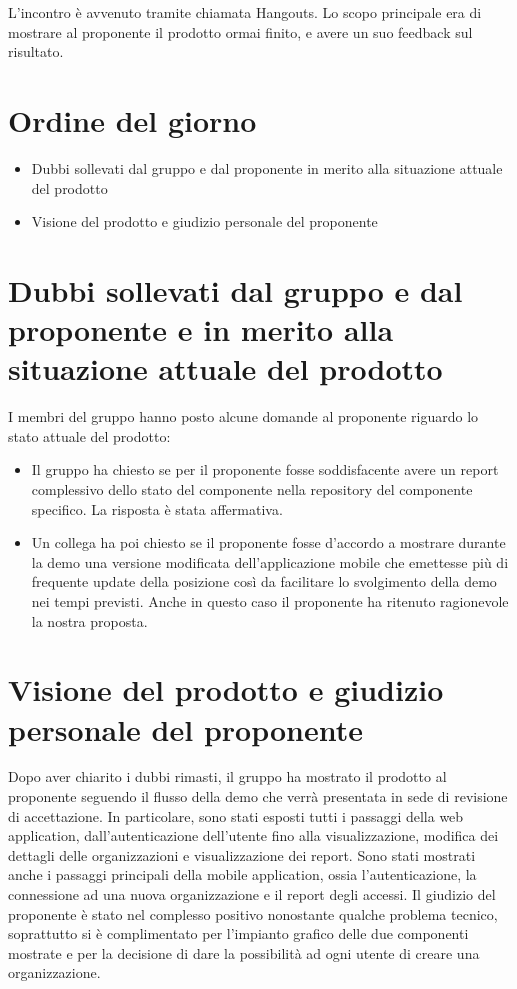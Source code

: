 \documentclass{article}
\begin{document}
L'incontro è avvenuto tramite chiamata Hangouts.
Lo scopo principale era di mostrare al proponente il prodotto ormai finito, e avere un suo feedback sul risultato.

\section{Ordine del giorno}%
\label{sec:ordine_del_giorno}

\begin{itemize}
  \item Dubbi sollevati dal gruppo e dal proponente in merito alla situazione attuale del prodotto
  \item Visione del prodotto e giudizio personale del proponente
\end{itemize}

\section{Dubbi sollevati dal gruppo e dal proponente e in merito alla situazione attuale del prodotto}%
\label{sec:dubbi_sollevati_dal_gruppo_e_dal_proponente_in_merito_alla_situazione_attuale_del_prodotto}

I membri del gruppo hanno posto alcune domande al proponente riguardo lo stato attuale del prodotto:
\begin{itemize}
  \item Il gruppo ha chiesto se per il proponente fosse soddisfacente avere un report complessivo dello stato del componente nella repository del componente specifico. La risposta è stata affermativa.
  \item Un collega ha poi chiesto se il proponente fosse d'accordo a mostrare durante la demo una versione modificata dell'applicazione mobile che emettesse più di frequente update della posizione così da facilitare lo svolgimento della demo nei tempi previsti. Anche in questo caso il proponente ha ritenuto ragionevole la nostra proposta.
\end{itemize}

\section{Visione del prodotto e giudizio personale del proponente}%
\label{sec:visione_del_prodotto_e_giudizio_personale_del_proponente}

Dopo aver chiarito i dubbi rimasti, il gruppo ha mostrato il prodotto al proponente seguendo il flusso della demo che verrà presentata in sede di revisione di accettazione.
In particolare, sono stati esposti tutti i passaggi della web application, dall'autenticazione dell'utente fino alla visualizzazione, modifica dei dettagli delle organizzazioni e visualizzazione dei report.
Sono stati mostrati anche i passaggi principali della mobile application, ossia l'autenticazione, la connessione ad una nuova organizzazione e il report degli accessi.
Il giudizio del proponente è stato nel complesso positivo nonostante qualche problema tecnico, soprattutto si è complimentato per l'impianto grafico delle due componenti mostrate e per la decisione di dare la possibilità ad ogni utente di creare una organizzazione.
\end{document}

